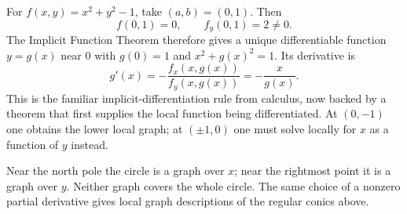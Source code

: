 \begin{example}\label{ex:circle-local-graph}
For $f(x,y)=x^2+y^2-1$, take $(a,b)=(0,1)$.  Then
\[
f(0,1)=0,
\qquad
f_y(0,1)=2\ne0.
\]
The Implicit Function Theorem therefore gives a unique differentiable
function $y=g(x)$ near $0$ with $g(0)=1$ and
$x^2+g(x)^2=1$.  Its derivative is
\[
g'(x)=-\frac{f_x(x,g(x))}{f_y(x,g(x))}
=-\frac{x}{g(x)}.
\]
This is the familiar implicit-differentiation rule from calculus, now backed
by a theorem that first supplies the local function being differentiated.
At $(0,-1)$ one obtains the lower local graph; at $(\pm1,0)$ one must solve
locally for $x$ as a function of $y$ instead.
\begin{center}
\begin{minipage}{0.52\linewidth}
\centering
{}
\end{minipage}\hfill
\begin{minipage}{0.45\linewidth}
Near the north pole the circle is a graph over $x$; near the rightmost
point it is a graph over $y$. Neither graph covers the whole circle.
The same choice of a nonzero partial derivative gives local graph
descriptions of the regular conics above.
\end{minipage}
\end{center}

\end{example}

